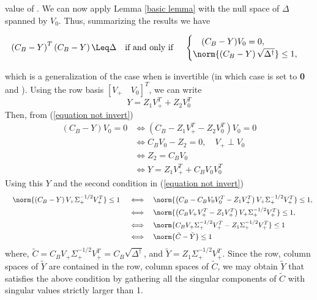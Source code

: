 value of .
We can now apply Lemma \ref{basic lemma} with the null space of 
$\Delta$ spanned by $V_0$. Thus, summarizing the results we have
\begin{lemma}\label{combined}
\begin{eqnarray}\label{equation not invert}
\left( {C}_B - {Y} \right)^T \left( {C}_B - {Y} \right) \Leq \Delta 
\text{\quad if and only if \quad }
\begin{cases}
\quad (C_B - Y)V_0 = 0, \\
\norm{\left( {C}_B - {Y} \right) \sqrt{\Delta^{\dagger}} } \leq 1,
\end{cases}
\end{eqnarray}
\end{lemma}
\noindent which is a generalization of the case when \math{\Delta} is invertible (in which case  is set to \textbf{0} and ).
Using the row basis  $[V_+ \quad V_0]^T$, we can write
\[Y = Z_1V_+^T + Z_2V_0^T\]
Then, from (\ref{equation not invert})
\begin{align*}
(C_B - Y)V_0 = 0 & \iff (C_B - Z_1V_+^T - Z_2V_0^T)V_0 = 0\\
& \iff C_BV_0 - Z_2 = 0, \quad V_+ \perp V_0\\
& \iff Z_2 = C_BV_0\\
& \iff Y = Z_1V_+^T + C_BV_0V_0^T
\end{align*}
Using this $Y$ and the second condition in (\ref{equation not invert})
\begin{align*}
\quad \norm{\left( {C}_B - {Y} \right) V_+ {\Sigma}^{-1/2}_+V_+^T } \leq 1 \quad \iff & \quad \norm{\left( {C}_B - C_BV_0V_0^T - Z_1V_+^T \right) V_+ {\Sigma}^{-1/2}_+V_+^T } \leq 1,\\
\iff & \quad \norm{\left(C_BV_+V_+^T - Z_1V_+^T \right) V_+ {\Sigma}^{-1/2}_+V_+^T } \leq 1,\\
\iff & \quad \norm{C_BV_+{\Sigma}^{-1/2}_+V_+^T  - Z_1{\Sigma}^{-1/2}_+V_+^T } \leq 1\\
\iff & \quad \norm{\tilde{C} - \tilde{Y}} \leq 1
\end{align*}
where, \quad $\tilde{C} = C_BV_+{\Sigma}^{-1/2}_+V_+^T = C_B \sqrt{\Delta^{\dagger}}$, \quad and \quad $\tilde{Y} = Z_1{\Sigma}^{-1/2}_+V_+^T$.
Since the row, column spaces of $\tilde Y$ are contained in the row, column spaces of $\tilde C$, we may obtain $\tilde{Y}$ that satisfies the above condition by gathering all the singular components of $\tilde{C}$ with singular values strictly larger than 1. 

